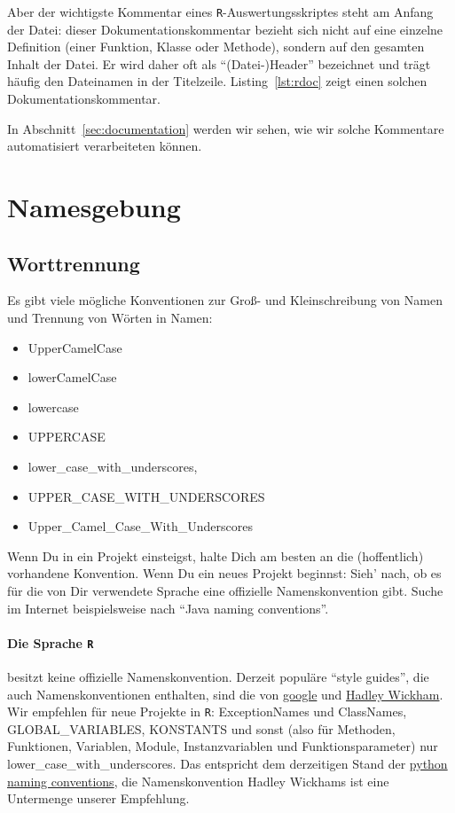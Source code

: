 \documentclass[twoside]{scrreprt}
\providecommand{\R}{\texttt{R}}
\begin{document}
Aber der wichtigste Kommentar eines \R{}-Auswertungsskriptes steht  
am Anfang der Datei: dieser Dokumentationskommentar bezieht sich nicht auf eine
einzelne Definition (einer Funktion, Klasse oder Methode), sondern auf den 
gesamten Inhalt der
Datei. Er wird daher oft als "`(Datei-)Header"' bezeichnet und tr\"a{}gt
h\"a{}ufig den Dateinamen in der Titelzeile.
Listing~\ref{lst:rdoc} zeigt einen solchen Dokumentationskommentar. 

 
In Abschnitt~\ref{sec:documentation} werden wir sehen, wie wir solche
Kommentare automatisiert verarbeiteten k\"o{}nnen.


\section{Namesgebung\label{sec:naming}}
\subsection{Worttrennung}
Es gibt viele m\"o{}gliche Konventionen zur Gro\ss{}- und Kleinschreibung  von
Namen und
Trennung von W\"o{}rten in Namen:
\begin{itemize}
\item UpperCamelCase
\item lowerCamelCase
\item lowercase
\item UPPERCASE
\item lower\_case\_with\_underscores,
\item UPPER\_CASE\_WITH\_UNDERSCORES
\item Upper\_Camel\_Case\_With\_Underscores
\end{itemize}
Wenn Du in ein Projekt einsteigst, halte Dich am besten an die (hoffentlich)
vorhandene Konvention.
Wenn Du ein neues Projekt beginnst: Sieh' nach, ob es f\"u{}r die von Dir 
verwendete Sprache eine offizielle Namenskonvention gibt. Suche im Internet 
beispielsweise nach "`Java naming conventions"'.

\paragraph{Die Sprache \R{}} besitzt keine offizielle
Namenskonvention. Derzeit
popul\"a{}re "`style guides"', die auch Namenskonventionen enthalten, sind die
von
\href{https://google-styleguide.googlecode.com/svn/trunk/Rguide.xml}{google} und
\href{http://adv-r.had.co.nz/Style.html}{Hadley Wickham}.
Wir empfehlen f\"u{}r neue Projekte in \R{}: 
ExceptionNames und ClassNames, GLOBAL\_VARIABLES, KONSTANTS und sonst (also
f\"u{}r Methoden, Funktionen, Variablen, Module, Instanzvariablen und
Funktionsparameter) nur 
lower\_case\_with\_underscores.
Das entspricht dem derzeitigen Stand der
\href{http://legacy.python.org/dev/peps/pep-0008/#naming-conventions}{python
  naming conventions}, die Namenskonvention Hadley Wickhams ist eine
  Untermenge unserer Empfehlung.
\end{document}
